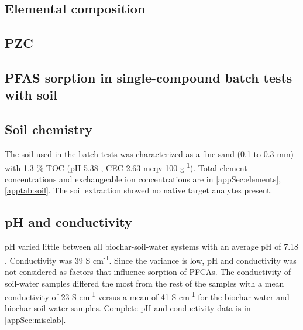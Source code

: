 \subsection{Elemental composition}

\subsection{PZC}

\subsection{PFAS sorption in single-compound batch tests with soil}
\subsection{Soil chemistry}
The soil used in the batch tests was characterized as a fine sand (0.1 to 0.3 mm) with 1.3 \% TOC (pH 5.38  , CEC 2.63  meqv 100 g\textsuperscript{-1}). Total element concentrations and exchangeable ion concentrations are in \cref{appSec:elements}, \cref{apptab:soil}. The soil extraction showed no native target analytes present.  


\subsection{pH and conductivity}
pH varied little between all biochar-soil-water systems with an average pH of 7.18 . Conductivity was 39  \textmu S cm\textsuperscript{-1}. Since the variance is low, pH and conductivity was not considered as factors that influence sorption of PFCAs. The conductivity of soil-water samples differed the most from the rest of the samples with a mean conductivity of 23  \textmu S cm\textsuperscript{-1} versus a mean of 41  \textmu S cm\textsuperscript{-1} for the biochar-water and biochar-soil-water samples. Complete pH and conductivity data is in \cref{appSec:misclab}. 

